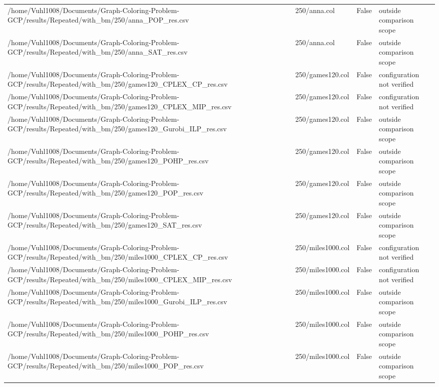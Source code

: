 \begin{table}[htbp]
\begin{tabular}{llll}
/home/Vuhl1008/Documents/Graph-Coloring-Problem-GCP/results/Repeated/with\_bm/250/anna\_POP\_res.csv & 250/anna.col & False & outside comparison scope \\
/home/Vuhl1008/Documents/Graph-Coloring-Problem-GCP/results/Repeated/with\_bm/250/anna\_SAT\_res.csv & 250/anna.col & False & outside comparison scope \\
/home/Vuhl1008/Documents/Graph-Coloring-Problem-GCP/results/Repeated/with\_bm/250/games120\_CPLEX\_CP\_res.csv & 250/games120.col & False & configuration not verified \\
/home/Vuhl1008/Documents/Graph-Coloring-Problem-GCP/results/Repeated/with\_bm/250/games120\_CPLEX\_MIP\_res.csv & 250/games120.col & False & configuration not verified \\
/home/Vuhl1008/Documents/Graph-Coloring-Problem-GCP/results/Repeated/with\_bm/250/games120\_Gurobi\_ILP\_res.csv & 250/games120.col & False & outside comparison scope \\
/home/Vuhl1008/Documents/Graph-Coloring-Problem-GCP/results/Repeated/with\_bm/250/games120\_POHP\_res.csv & 250/games120.col & False & outside comparison scope \\
/home/Vuhl1008/Documents/Graph-Coloring-Problem-GCP/results/Repeated/with\_bm/250/games120\_POP\_res.csv & 250/games120.col & False & outside comparison scope \\
/home/Vuhl1008/Documents/Graph-Coloring-Problem-GCP/results/Repeated/with\_bm/250/games120\_SAT\_res.csv & 250/games120.col & False & outside comparison scope \\
/home/Vuhl1008/Documents/Graph-Coloring-Problem-GCP/results/Repeated/with\_bm/250/miles1000\_CPLEX\_CP\_res.csv & 250/miles1000.col & False & configuration not verified \\
/home/Vuhl1008/Documents/Graph-Coloring-Problem-GCP/results/Repeated/with\_bm/250/miles1000\_CPLEX\_MIP\_res.csv & 250/miles1000.col & False & configuration not verified \\
/home/Vuhl1008/Documents/Graph-Coloring-Problem-GCP/results/Repeated/with\_bm/250/miles1000\_Gurobi\_ILP\_res.csv & 250/miles1000.col & False & outside comparison scope \\
/home/Vuhl1008/Documents/Graph-Coloring-Problem-GCP/results/Repeated/with\_bm/250/miles1000\_POHP\_res.csv & 250/miles1000.col & False & outside comparison scope \\
/home/Vuhl1008/Documents/Graph-Coloring-Problem-GCP/results/Repeated/with\_bm/250/miles1000\_POP\_res.csv & 250/miles1000.col & False & outside comparison scope \\

\end{tabular}
\end{table}
